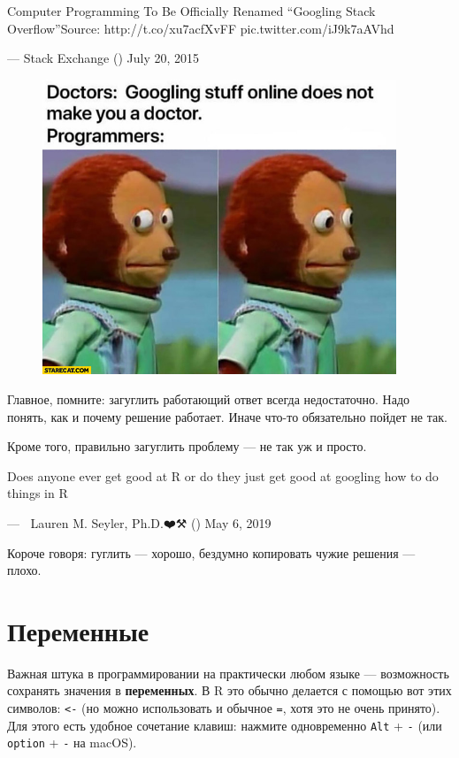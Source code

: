 \documentclass[]{book}
\begin{document}
Computer Programming To Be Officially Renamed ``Googling Stack
Overflow''Source: http://t.co/xu7acfXvFF pic.twitter.com/iJ9k7aAVhd

--- Stack Exchange (\citet{StackExchange}) July 20, 2015

\begin{figure}
\centering
\includegraphics[width=4.16667in]{images/doctors-googling-stuff-online-does-not-make-you-a-doctor-programmers-confused.jpg}
\caption{}
\end{figure}

Главное, помните: загуглить работающий ответ всегда недостаточно. Надо
понять, как и почему решение работает. Иначе что-то обязательно пойдет
не так.

Кроме того, правильно загуглить проблему --- не так уж и просто.

Does anyone ever get good at R or do they just get good at googling how
to do things in R

--- 🔬🖤Lauren M. Seyler, Ph.D.❤️⚒ (\citet{mousquemere}) May 6, 2019

Короче говоря: гуглить --- хорошо, бездумно копировать чужие решения ---
плохо.

\section{Переменные}\label{variables}

Важная штука в программировании на практически любом языке ---
возможность сохранять значения в \textbf{переменных}. В R это обычно
делается с помощью вот этих символов: \texttt{\textless{}-} (но можно
использовать и обычное \texttt{=}, хотя это не очень принято). Для этого
есть удобное сочетание клавиш: нажмите одновременно \texttt{Alt} +
\texttt{-} (или \texttt{option} + \texttt{-} на macOS).
\end{document}

